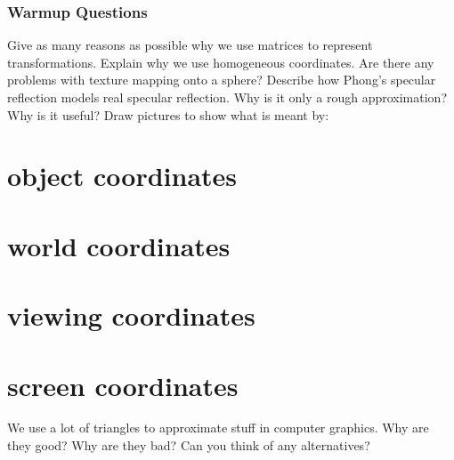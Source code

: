 \documentclass{supervision}
\begin{document}
\section*{Warmup Questions}
\begin{questions}
    \question
    Give as many reasons as possible why we use matrices to represent transformations. Explain why we use homogeneous coordinates.
    \question
    Are there any problems with texture mapping onto a sphere?
    \question
    Describe how Phong's specular reflection models real specular reflection. Why
is it only a rough approximation? Why is it useful?
    \question
    Draw pictures to show what is meant by:
    \begin{parts}
        \part{object coordinates}
        \part{world coordinates}
        \part{viewing coordinates}
        \part{screen coordinates}
    \end{parts}
    \question
    We use a lot of triangles to approximate stuff in computer graphics. Why are they good? Why are they bad? Can you think of any alternatives?

\end{questions}
\end{document}
